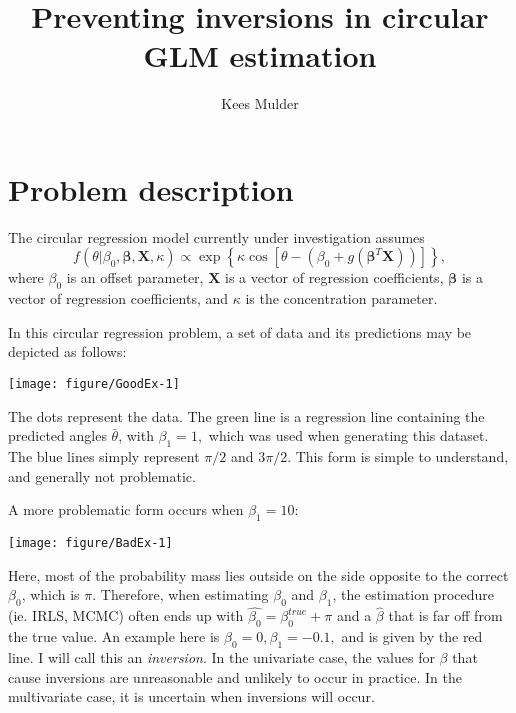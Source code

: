 \documentclass[12pt,a4paper]{article}\usepackage[]{graphicx}\usepackage[]{color}
\author{Kees Mulder}
\title{Preventing inversions in circular GLM estimation}
\makeatletter
\def\maxwidth{ %
  \ifdim\Gin@nat@width>\linewidth
    \linewidth
  \else
    \Gin@nat@width
  \fi
}
\newenvironment{knitrout}{}{} %
\makeatother
\begin{document}
\maketitle




\section{Problem description}

The circular regression model currently under investigation assumes
$$ f(\theta \vert \beta_0, \boldsymbol\beta, \boldsymbol{X}, \kappa) \propto  \exp \left\lbrace \kappa \cos \left[ \theta - \left( \beta_0 + g ( \boldsymbol\beta^T \boldsymbol{X})  \right)  \right] \right\rbrace, $$
where $\beta_0$ is an offset parameter, $\boldsymbol{X}$ is a vector of regression coefficients, $\boldsymbol\beta$ is a vector of regression coefficients, and $\kappa$ is the concentration parameter.

In this circular regression problem, a set of data and its predictions may be depicted as follows:

\begin{knitrout}
\color{fgcolor}

{\centering \texttt{[image: figure/GoodEx-1]} 

}



\end{knitrout}

The dots represent the data. The green line is a regression line containing the predicted angles $\bar\theta$, with $\beta_1 = 1,$ which was used when generating this dataset. The blue lines simply represent $\pi/2$ and $3\pi/2$. This form is simple to understand, and generally not problematic.

A more problematic form occurs when $\beta_1=10$:

\begin{knitrout}
\color{fgcolor}

{\centering \texttt{[image: figure/BadEx-1]} 

}



\end{knitrout}

Here, most of the probability mass lies outside on the side opposite to the correct $\beta_0$, which is $\pi$. Therefore, when estimating $\beta_0$ and $\beta_1$, the estimation procedure (ie. IRLS, MCMC) often ends up with $\hat{\beta_0} = \beta_0^{true} + \pi$ and a $\hat{\beta}$ that is far off from the true value. An example here is  $\beta_0=0, \beta_1=-0.1,$ and is given by the red line. I will call this an \textit{inversion}. In the univariate case, the values for $\beta$ that cause inversions are unreasonable and unlikely to occur in practice. In the multivariate case, it is uncertain when inversions will occur.
\end{document}
